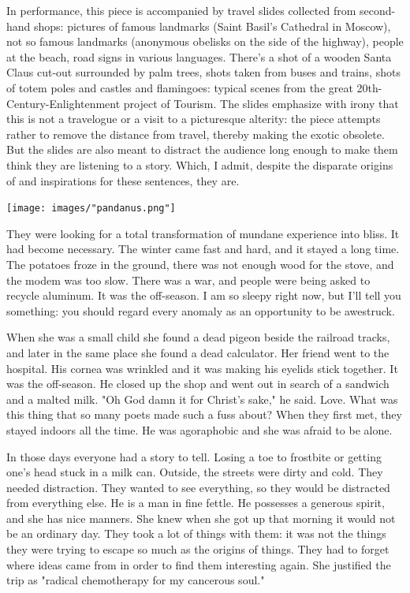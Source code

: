 \documentclass[
]{memoir}
\begin{document}
In performance, this piece is accompanied by travel slides collected
from second-hand shops: pictures of famous landmarks (Saint Basil's
Cathedral in Moscow), not so famous landmarks (anonymous obelisks on the
side of the highway), people at the beach, road signs in various
languages. There's a shot of a wooden Santa Claus cut-out surrounded by
palm trees, shots taken from buses and trains, shots of totem poles and
castles and flamingoes: typical scenes from the great
20th-Century-Enlightenment project of Tourism. The slides emphasize with
irony that this is not a travelogue or a visit to a picturesque
alterity: the piece attempts rather to remove the distance from travel,
thereby making the exotic obsolete. But the slides are also meant to
distract the audience long enough to make them think they are listening
to a story. Which, I admit, despite the disparate origins of and
inspirations for these sentences, they are.

\begin{center}\texttt{[image: images/"pandanus.png"]}\end{center}

They were looking for a total transformation of mundane experience into
bliss. It had become necessary. The winter came fast and hard, and it
stayed a long time. The potatoes froze in the ground, there was not
enough wood for the stove, and the modem was too slow. There was a war,
and people were being asked to recycle aluminum. It was the off-season.
I am so sleepy right now, but I'll tell you something: you should regard
every anomaly as an opportunity to be awestruck.

When she was a small child she found a dead pigeon beside the railroad
tracks, and later in the same place she found a dead calculator. Her
friend went to the hospital. His cornea was wrinkled and it was making
his eyelids stick together. It was the off-season. He closed up the shop
and went out in search of a sandwich and a malted milk. "Oh God damn it
for Christ's sake," he said. Love. What was this thing that so many
poets made such a fuss about? When they first met, they stayed indoors
all the time. He was agoraphobic and she was afraid to be alone.

In those days everyone had a story to tell. Losing a toe to frostbite or
getting one's head stuck in a milk can. Outside, the streets were dirty
and cold. They needed distraction. They wanted to see everything, so
they would be distracted from everything else. He is a man in fine
fettle. He possesses a generous spirit, and she has nice manners. She
knew when she got up that morning it would not be an ordinary day. They
took a lot of things with them: it was not the things they were trying
to escape so much as the origins of things. They had to forget where
ideas came from in order to find them interesting again. She justified
the trip as "radical chemotherapy for my cancerous soul."
\end{document}

